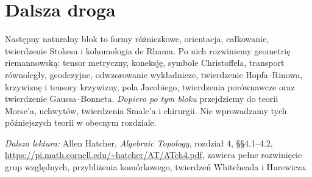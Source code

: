 \section*{Dalsza droga}
Następny naturalny blok to
formy różniczkowe,
orientacja, całkowanie,
twierdzenie Stokesa
i kohomologia de Rhama.
Po nich rozwiniemy
geometrię riemannowską:
tensor metryczny, koneksję,
symbole Christoffela,
transport równoległy,
geodezyjne, odwzorowanie
wykładnicze, twierdzenie
Hopfa--Rinowa, krzywiznę
i tensory krzywizny,
pola Jacobiego,
twierdzenia porównawcze
oraz twierdzenie
Gaussa--Bonneta.
\emph{Dopiero po tym bloku}
przejdziemy do teorii
Morse'a, uchwytów,
twierdzenia Smale'a
i chirurgii.
Nie wprowadzamy
tych późniejszych
teorii w obecnym rozdziale.

\par\smallskip
{\footnotesize\noindent\emph{Dalsza lektura:}
Allen Hatcher,
\emph{Algebraic Topology},
rozdział 4, §§4.1--4.2,
\url{https://pi.math.cornell.edu/~hatcher/AT/ATch4.pdf},
zawiera pełne rozwinięcie
grup względnych,
przybliżenia komórkowego,
twierdzeń Whiteheada
i Hurewicza.\par}
\clearpage
